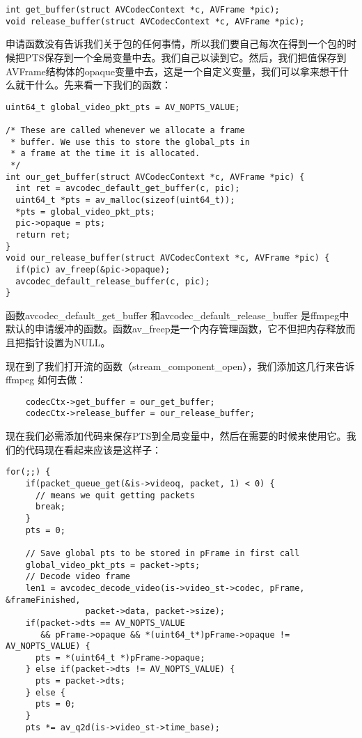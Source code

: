 \begin{lstlisting}
int get_buffer(struct AVCodecContext *c, AVFrame *pic);
void release_buffer(struct AVCodecContext *c, AVFrame *pic);
\end{lstlisting}

申请函数没有告诉我们关于包的任何事情，所以我们要自己每次在得到一个包的时候把PTS保存到一个全局变量中去。我们自己以读到它。然后，我们把值保存到AVFrame结构体的opaque变量中去，这是一个自定义变量，我们可以拿来想干什么就干什么。先来看一下我们的函数：
\begin{lstlisting}
uint64_t global_video_pkt_pts = AV_NOPTS_VALUE;

/* These are called whenever we allocate a frame
 * buffer. We use this to store the global_pts in
 * a frame at the time it is allocated.
 */
int our_get_buffer(struct AVCodecContext *c, AVFrame *pic) {
  int ret = avcodec_default_get_buffer(c, pic);
  uint64_t *pts = av_malloc(sizeof(uint64_t));
  *pts = global_video_pkt_pts;
  pic->opaque = pts;
  return ret;
}
void our_release_buffer(struct AVCodecContext *c, AVFrame *pic) {
  if(pic) av_freep(&pic->opaque);
  avcodec_default_release_buffer(c, pic);
}
\end{lstlisting}

函数avcodec_default_get_buffer 和avcodec_default_release_buffer 是ffmpeg中默认的申请缓冲的函数。函数av_freep是一个内存管理函数，它不但把内存释放而且把指针设置为NULL。

现在到了我们打开流的函数（stream_component_open），我们添加这几行来告诉ffmpeg 如何去做：

\begin{lstlisting}
    codecCtx->get_buffer = our_get_buffer;
    codecCtx->release_buffer = our_release_buffer;
\end{lstlisting}

现在我们必需添加代码来保存PTS到全局变量中，然后在需要的时候来使用它。我们的代码现在看起来应该是这样子：

\begin{lstlisting}
for(;;) {
    if(packet_queue_get(&is->videoq, packet, 1) < 0) {
      // means we quit getting packets
      break;
    }
    pts = 0;

    // Save global pts to be stored in pFrame in first call
    global_video_pkt_pts = packet->pts;
    // Decode video frame
    len1 = avcodec_decode_video(is->video_st->codec, pFrame, &frameFinished,
                packet->data, packet->size);
    if(packet->dts == AV_NOPTS_VALUE
       && pFrame->opaque && *(uint64_t*)pFrame->opaque != AV_NOPTS_VALUE) {
      pts = *(uint64_t *)pFrame->opaque;
    } else if(packet->dts != AV_NOPTS_VALUE) {
      pts = packet->dts;
    } else {
      pts = 0;
    }
    pts *= av_q2d(is->video_st->time_base);
\end{lstlisting}

